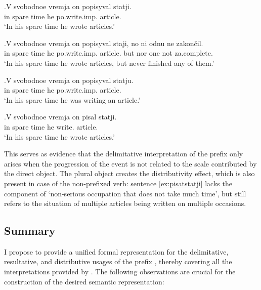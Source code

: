 \exg.\label{ex:popisyvat}V svobodnoe vremja on popisyval statji.\\
in spare time he po.write.imp. article.\\
\trans `In his spare time he wrote articles.'

\exg.\label{ex:popisyvat:none}V svobodnoe vremja on popisyval staji, no ni odnu ne zakon\v{c}il.\\
in spare time he po.write.imp. article. but nor one not za.complete.\\
\trans `In his spare time he wrote articles, but never finished any of them.'

\exg.\label{ex:popisyvat:single}V svobodnoe vremja on popisyval statju.\\
in spare time he po.write.imp. article.\\
\trans `In his spare time he was writing an article.'

\exg.\label{ex:pisatstatji}V svobodnoe vremja on pisal statji.\\
in spare time he write. article.\\
\trans `In his spare time he wrote articles.'

This serves as evidence that the delimitative interpretation of the prefix  only arises when the progression of the event is not related to the scale contributed by the direct object. The plural object creates the distributivity effect, which is also present in case of the non-prefixed verb: sentence \ref{ex:pisatstatji} lacks the component of `non-serious occupation that does not take much time', but still refers to the situation of multiple articles being written on multiple occasions. 

\subsection{Summary}
I propose to provide a unified formal representation for the delimitative, resultative, and distributive usages of the prefix , thereby covering all the interpretations provided by \citet{Shvedova:82}. The following observations are crucial for the construction of the desired semantic representation:

